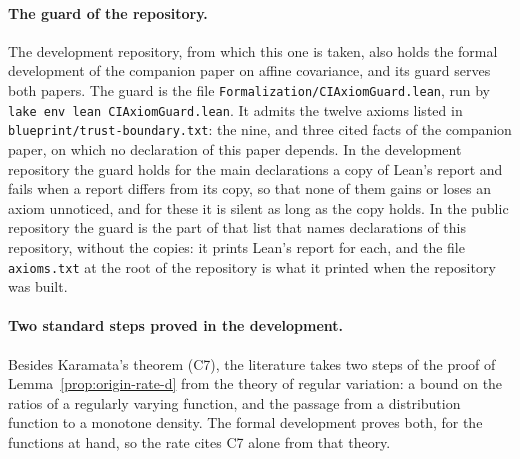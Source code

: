 \paragraph{The guard of the repository.} The development repository, from which this one is
taken, also holds the formal development of the companion paper on affine covariance, and its
guard serves both papers. The guard is the file
\texttt{Formalization/CIAxiomGuard.lean}, run by \texttt{lake env lean CIAxiomGuard.lean}. It
admits the twelve axioms listed in \texttt{blueprint/trust-boundary.txt}: the nine, and three
cited facts of the companion paper, on which no declaration of this paper depends. In the
development repository the guard holds for the main
declarations a copy of Lean's report and fails when a report differs from its copy, so
that none of them gains or loses an axiom unnoticed, and for these it is silent as long as the
copy holds. In the public repository the guard is the part of that list that names
declarations of this repository, without the
copies: it prints Lean's report for each, and the file \texttt{axioms.txt} at the root of the
repository is what it printed when the repository was built.

\paragraph{Two standard steps proved in the development.} Besides Karamata's theorem (C7), the
literature takes two steps of the proof of Lemma~\ref{prop:origin-rate-d} from the theory
of regular variation: a bound on the ratios of a regularly varying function, and the passage from
a distribution function to a monotone density. The formal development proves both, for the
functions at hand, so the rate cites C7 alone from that theory.

